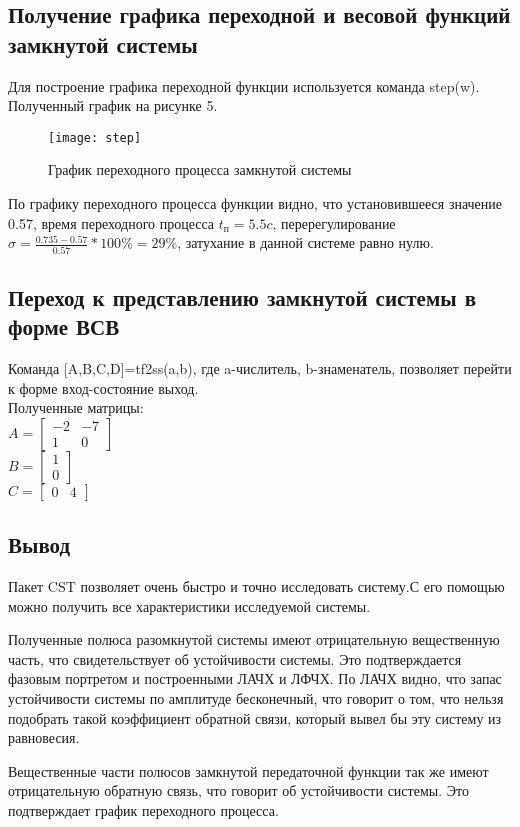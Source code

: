 \documentclass[a4paper, 12pt]{article}
\begin{document}
	\subsection{Получение графика переходной и весовой функций замкнутой системы}
	Для построение графика переходной функции используется команда step(w). Полученный график на рисунке 5.
	\begin{figure}[h!]
		\begin{center}
			\texttt{[image: step]}
			\caption{График переходного процесса замкнутой системы}
		\end{center}  
	\end{figure}\par
	По графику переходного процесса функции видно, что установившееся значение 0.57, время переходного процесса $t_\text{п}=5.5c$, перерегулирование $\sigma=\frac{0.735-0.57}{0.57}*100\%=29\%$, затухание в данной системе равно нулю. 
	\newpage
	\subsection{Переход к представлению замкнутой системы в форме ВСВ}
	Команда [A,B,C,D]=tf2ss(a,b), где a-числитель, b-знаменатель, позволяет перейти к форме вход-состояние выход.\\
	Полученные матрицы:\\
	$A=\begin{bmatrix} -2 & -7 \\ 1 & 0 \end{bmatrix}$\\
	$B=\begin{bmatrix}  1 \\ 0  \end{bmatrix}$\\
	$C=\begin{bmatrix}  0 & 4  \end{bmatrix}$\\
	\newpage
	\begin{center}
		\section*{Вывод}
	\end{center}\par
	Пакет CST позволяет очень быстро и точно исследовать систему.С его помощью можно получить все характеристики исследуемой системы.\par
	Полученные полюса разомкнутой системы имеют отрицательную вещественную часть, что свидетельствует об устойчивости системы. Это подтверждается фазовым портретом и построенными ЛАЧХ и ЛФЧХ. По ЛАЧХ видно, что запас устойчивости системы по амплитуде бесконечный, что говорит о том, что нельзя подобрать такой коэффициент обратной связи, который вывел бы эту систему из равновесия.\par
	Вещественные части полюсов замкнутой передаточной функции так же имеют отрицательную обратную связь, что говорит об устойчивости системы. Это подтверждает график переходного процесса.
\end{document}
